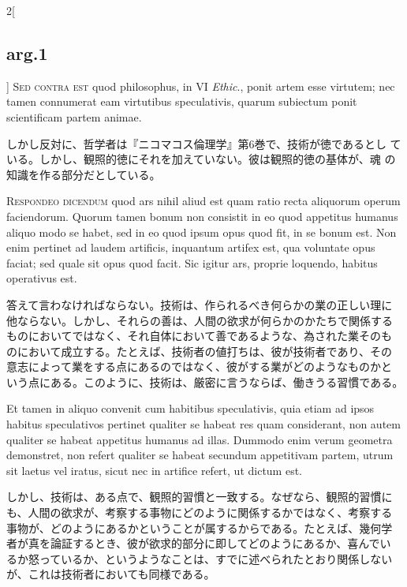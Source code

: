\documentclass[paper=a4paper,fontsize=10pt,jafontsize=9pt,titlepage]{jlreq}
\begin{document}
\begin{paracol}{2}[\subsection{arg.1}]
{\scshape Sed contra est} quod philosophus, in VI {\itshape Ethic}.,
ponit artem esse virtutem; nec tamen connumerat eam virtutibus
speculativis, quarum subiectum ponit scientificam partem animae.

\switchcolumn

しかし反対に、哲学者は『ニコマコス倫理学』第6巻で、技術が徳であるとし
ている。しかし、観照的徳にそれを加えていない。彼は観照的徳の基体が、魂
の知識を作る部分だとしている。


{\scshape Respondeo dicendum} quod ars nihil aliud est quam ratio
recta aliquorum operum faciendorum. Quorum tamen bonum non consistit
in eo quod appetitus humanus aliquo modo se habet, sed in eo quod
ipsum opus quod fit, in se bonum est. Non enim pertinet ad laudem
artificis, inquantum artifex est, qua voluntate opus faciat; sed quale
sit opus quod facit. Sic igitur ars, proprie loquendo, habitus
operativus est.

\switchcolumn

答えて言わなければならない。技術は、作られるべき何らかの業の正しい理に
他ならない。しかし、それらの善は、人間の欲求が何らかのかたちで関係する
ものにおいてではなく、それ自体において善であるような、為された業そのも
のにおいて成立する。たとえば、技術者の値打ちは、彼が技術者であり、その
意志によって業をする点にあるのではなく、彼がする業がどのようなものかと
いう点にある。このように、技術は、厳密に言うならば、働きうる習慣である。

\switchcolumn*

Et tamen in aliquo convenit cum habitibus speculativis, quia etiam ad
ipsos habitus speculativos pertinet qualiter se habeat res quam
considerant, non autem qualiter se habeat appetitus humanus ad
illas. Dummodo enim verum geometra demonstret, non refert qualiter se
habeat secundum appetitivam partem, utrum sit laetus vel iratus, sicut
nec in artifice refert, ut dictum est.

\switchcolumn

しかし、技術は、ある点で、観照的習慣と一致する。なぜなら、観照的習慣に
も、人間の欲求が、考察する事物にどのように関係するかではなく、考察する
事物が、どのようにあるかということが属するからである。たとえば、幾何学
者が真を論証するとき、彼が欲求的部分に即してどのようにあるか、喜んでい
るか怒っているか、というようなことは、すでに述べられたとおり関係しない
が、これは技術者においても同様である。


\end{paracol}
\end{document}
